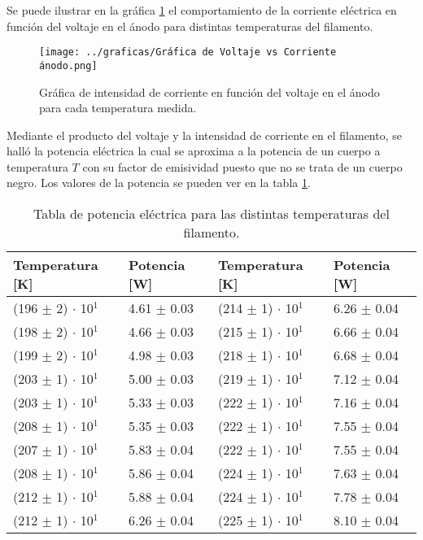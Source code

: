 \documentclass[%
 reprint,
 amsmath,amssymb,
 aps,
]{revtex4-2}
\begin{document}
\vspace{0.2 cm}
Se puede ilustrar en la gráfica \ref{fig: Gráfica de Voltaje vs Corriente ánodo} el comportamiento de la corriente eléctrica en función del voltaje en el ánodo para distintas temperaturas del filamento.

\begin{figure}[H]
    \centering
    \texttt{[image: ../graficas/Gráfica de Voltaje vs Corriente ánodo.png]}
    \caption{Gráfica de intensidad de corriente en función del voltaje en el ánodo para cada temperatura medida.}
    \label{fig: Gráfica de Voltaje vs Corriente ánodo}
\end{figure}

\vspace{0.2 cm}
Mediante el producto del voltaje y la intensidad de corriente en el filamento, se halló la potencia eléctrica la cual se aproxima a la potencia de un cuerpo a temperatura $T$ con su factor de emisividad puesto que no se trata de un cuerpo negro. Los valores de la potencia se pueden ver en la tabla \ref{tab: Potencia eléctrica}.

\begin{table}[H]
    \centering
    \begin{tabular}{l|l||l|l}
        \toprule
        \toprule
        Temperatura [K] & Potencia [W] & Temperatura [K] & Potencia [W] \\
        \midrule
        (196 $\pm$ 2) $\cdot$ 10$^{1}$  &  4.61 $\pm$ 0.03 & (214 $\pm$ 1) $\cdot$ 10$^{1}$  &  6.26 $\pm$ 0.04 \\
        (198 $\pm$ 2) $\cdot$ 10$^{1}$  &  4.66 $\pm$ 0.03 & (215 $\pm$ 1) $\cdot$ 10$^{1}$  &  6.66 $\pm$ 0.04 \\
        (199 $\pm$ 2) $\cdot$ 10$^{1}$  &  4.98 $\pm$ 0.03 & (218 $\pm$ 1) $\cdot$ 10$^{1}$  &  6.68 $\pm$ 0.04\\
        (203 $\pm$ 1) $\cdot$ 10$^{1}$  &  5.00 $\pm$ 0.03 & (219 $\pm$ 1) $\cdot$ 10$^{1}$  &  7.12 $\pm$ 0.04\\
        (203 $\pm$ 1) $\cdot$ 10$^{1}$  &  5.33 $\pm$ 0.03 & (222 $\pm$ 1) $\cdot$ 10$^{1}$  &  7.16 $\pm$ 0.04\\
        (208 $\pm$ 1) $\cdot$ 10$^{1}$  &  5.35 $\pm$ 0.03 & (222 $\pm$ 1) $\cdot$ 10$^{1}$  &  7.55 $\pm$ 0.04 \\
        (207 $\pm$ 1) $\cdot$ 10$^{1}$  &  5.83 $\pm$ 0.04 & (222 $\pm$ 1) $\cdot$ 10$^{1}$  &  7.55 $\pm$ 0.04\\
        (208 $\pm$ 1) $\cdot$ 10$^{1}$  &  5.86 $\pm$ 0.04 & (224 $\pm$ 1) $\cdot$ 10$^{1}$  &  7.63 $\pm$ 0.04\\
        (212 $\pm$ 1) $\cdot$ 10$^{1}$  &  5.88 $\pm$ 0.04 & (224 $\pm$ 1) $\cdot$ 10$^{1}$  &  7.78 $\pm$ 0.04\\
        (212 $\pm$ 1) $\cdot$ 10$^{1}$  &  6.26 $\pm$ 0.04 & (225 $\pm$ 1) $\cdot$ 10$^{1}$  &  8.10 $\pm$ 0.04\\
        \bottomrule
        \bottomrule

    \end{tabular}
    \caption{Tabla de potencia eléctrica para las distintas temperaturas del filamento.}
    \label{tab: Potencia eléctrica}
\end{table}
\end{document}
